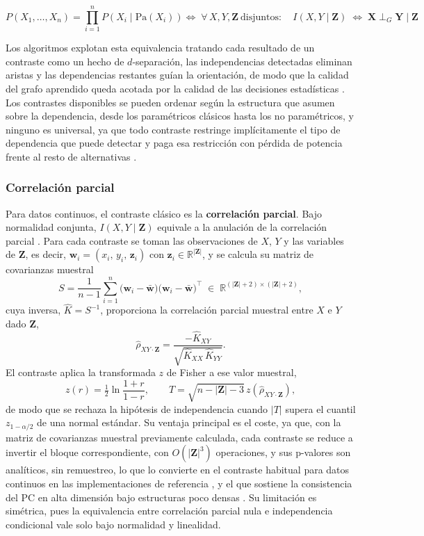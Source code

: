 \[
P(X_1,\dots,X_n)=\prod_{i=1}^{n}P(X_i\mid \mathrm{Pa}(X_i)) \Longleftrightarrow\;
\forall\, X, Y,\mathbf{Z}\ \text{disjuntos}:\quad
I(X, Y\mid\mathbf{Z})\;\Longleftrightarrow\;
\mathbf{X}\perp_{G}\mathbf{Y}\mid\mathbf{Z}
\] 


Los algoritmos explotan esta equivalencia tratando cada resultado de un contraste como un hecho de $d$-separación, las independencias detectadas eliminan aristas y las dependencias restantes guían la orientación, de modo que la calidad del grafo aprendido queda acotada por la calidad de
las decisiones estadísticas \citep{spirtes2000causation, pearl2009causality}. Los contrastes disponibles se pueden ordenar según la estructura que asumen sobre la dependencia, desde los paramétricos clásicos hasta los no paramétricos, y ninguno es universal, ya que todo contraste restringe implícitamente el tipo de dependencia que puede detectar y paga esa restricción con pérdida de potencia frente al resto de alternativas \citep{shah2020gcm}.

\subsubsection{Correlación parcial}              
Para datos continuos, el contraste clásico es la \textbf{correlación parcial}. Bajo
normalidad conjunta, $I(X, Y \mid \mathbf{Z})$ equivale a la anulación de la correlación parcial \citep{lauritzen1996graphical}.  Para cada contraste se
toman las observaciones de $X$, $Y$ y las variables de $\mathbf{Z}$, es decir,
$\mathbf{w}_i = (x_i,\, y_i,\, \mathbf{z}_i)$ con
$\mathbf{z}_i \in \mathbb{R}^{|\mathbf{Z}|}$, y se calcula su matriz de covarianzas
muestral
\[
S = \frac{1}{n-1}\sum_{i=1}^{n}
\bigl(\mathbf{w}_i - \bar{\mathbf{w}}\bigr)
\bigl(\mathbf{w}_i - \bar{\mathbf{w}}\bigr)^\top
\;\in\; \mathbb{R}^{(|\mathbf{Z}|+2)\times(|\mathbf{Z}|+2)},
\]
cuya inversa, $\hat{K} = S^{-1}$, proporciona la correlación parcial muestral entre $X$ e
$Y$ dado $\mathbf{Z}$,
\[
\hat{\rho}_{XY\cdot\mathbf{Z}}
= \frac{-\hat{K}_{XY}}{\sqrt{\hat{K}_{XX}\,\hat{K}_{YY}}}.
\]
El contraste aplica la transformada $z$ de Fisher \citep{hotelling1953new} a ese valor muestral,
\[
z(r) = \tfrac{1}{2}\ln\frac{1+r}{1-r},
\qquad
T = \sqrt{n-|\mathbf{Z}|-3}\, z(\hat{\rho}_{XY\cdot\mathbf{Z}}),
\]
de modo que se rechaza la hipótesis de independencia cuando $|T|$ supera el cuantil $z_{1-\alpha/2}$ de una normal estándar. Su ventaja principal es el coste, ya que, con la matriz de covarianzas muestral previamente calculada, cada contraste se reduce a invertir el bloque correspondiente, con $O(|\mathbf{Z}|^3)$ operaciones, y sus p-valores son analíticos, sin remuestreo, lo que lo convierte en el contraste habitual para datos continuos en las implementaciones de referencia \citep{kalisch2012causal, scutari2010bnlearn}, y el que sostiene la consistencia del PC en alta dimensión bajo estructuras poco densas \citep{kalisch2007estimating}. Su limitación es simétrica, pues la
equivalencia entre correlación parcial nula e independencia condicional vale solo bajo normalidad y linealidad.

